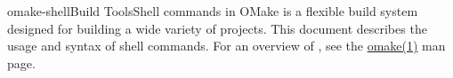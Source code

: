 %
%
%
\begin{Name}{1}{omake-shell}{\authors}{Build Tools}{Shell commands in OMake}
   is a flexible build system designed for building a wide variety of projects.
  This document describes the usage and syntax of shell commands.
  For an overview of , see the \href{omake.html}{omake(1)} man page.
\end{Name}

